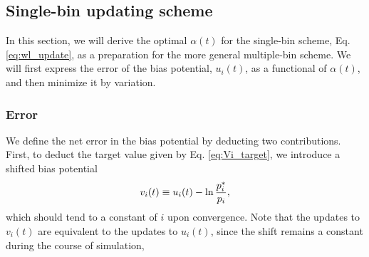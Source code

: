 \documentclass[reprint, superscriptaddress, floatfix]{revtex4-1}
\begin{document}
\subsection{\label{sec:single-bin}
Single-bin updating scheme}



In this section,
we will derive the optimal $\alpha(t)$
for the single-bin scheme,
Eq. \eqref{eq:wl_update},
as a preparation
for the more general multiple-bin scheme.
%
%
We will first express the error of
the bias potential, $u_i(t)$,
as a functional of $\alpha(t)$,
and then minimize it by variation.
%



\subsubsection{Error}



We define the net error in the bias potential
by deducting two contributions.
%
First, to deduct the target value given by
Eq. \eqref{eq:Vi_target},
we introduce a shifted bias potential
%
\begin{equation}
  v_i(t)
  \equiv
  u_i(t)
  -
  \ln \frac { p^*_i }
            { p_i }
  ,
  \notag
\end{equation}
%
which should tend to a constant of $i$
upon convergence.
Note that the updates to $v_i(t)$ are
equivalent to the updates to $u_i(t)$,
since the shift
remains a constant during the course of simulation,
\end{document}
